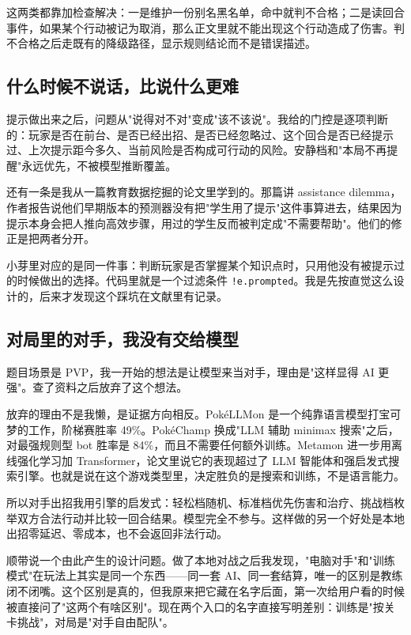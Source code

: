这两类都靠加检查解决：一是维护一份别名黑名单，命中就判不合格；二是读回合事件，如果某个行动被记为取消，那么正文里就不能出现这个行动造成了伤害。判不合格之后走既有的降级路径，显示规则结论而不是错误描述。

\subsection{什么时候不说话，比说什么更难}

提示做出来之后，问题从"说得对不对"变成"该不该说"。我给的门控是逐项判断的：玩家是否在前台、是否已经出招、是否已经忽略过、这个回合是否已经提示过、上次提示距今多久、当前风险是否构成可行动的风险。安静档和"本局不再提醒"永远优先，不被模型推断覆盖。

还有一条是我从一篇教育数据挖掘的论文里学到的。那篇讲 assistance dilemma，作者报告说他们早期版本的预测器没有把"学生用了提示"这件事算进去，结果因为提示本身会把人推向高效步骤，用过的学生反而被判定成"不需要帮助"。他们的修正是把两者分开。

小芽里对应的是同一件事：判断玩家是否掌握某个知识点时，只用他没有被提示过的时候做出的选择。代码里就是一个过滤条件 \texttt{!e.prompted}。我是先按直觉这么设计的，后来才发现这个踩坑在文献里有记录。

\subsection{对局里的对手，我没有交给模型}

题目场景是 PVP，我一开始的想法是让模型来当对手，理由是"这样显得 AI 更强"。查了资料之后放弃了这个想法。

放弃的理由不是我懒，是证据方向相反。PokéLLMon 是一个纯靠语言模型打宝可梦的工作，阶梯赛胜率 49\%。PokéChamp 换成"LLM 辅助 minimax 搜索"之后，对最强规则型 bot 胜率是 84\%，而且不需要任何额外训练。Metamon 进一步用离线强化学习加 Transformer，论文里说它的表现超过了 LLM 智能体和强启发式搜索引擎。也就是说在这个游戏类型里，决定胜负的是搜索和训练，不是语言能力。

所以对手出招我用引擎的启发式：轻松档随机、标准档优先伤害和治疗、挑战档枚举双方合法行动并比较一回合结果。模型完全不参与。这样做的另一个好处是本地出招零延迟、零成本，也不会返回非法行动。

顺带说一个由此产生的设计问题。做了本地对战之后我发现，"电脑对手"和"训练模式"在玩法上其实是同一个东西——同一套 AI、同一套结算，唯一的区别是教练闭不闭嘴。这个区别是真的，但我原来把它藏在名字后面，第一次给用户看的时候被直接问了"这两个有啥区别"。现在两个入口的名字直接写明差别：训练是"按关卡挑战"，对局是"对手自由配队"。


